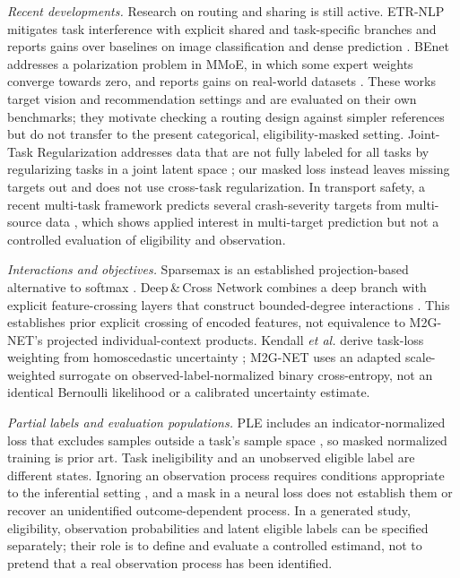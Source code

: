 \documentclass[9pt, conference, a4paper, compsocconf]{IEEEtran}
\begin{document}
\textit{Recent developments.} Research on routing and sharing is still active. ETR-NLP mitigates task interference with explicit shared and task-specific branches and reports gains over baselines on image classification and dense prediction \cite{Ding2023mitigating}. BEnet addresses a polarization problem in MMoE, in which some expert weights converge towards zero, and reports gains on real-world datasets \cite{Zhang2025bagging}. These works target vision and recommendation settings and are evaluated on their own benchmarks; they motivate checking a routing design against simpler references but do not transfer to the present categorical, eligibility-masked setting. Joint-Task Regularization addresses data that are not fully labeled for all tasks by regularizing tasks in a joint latent space \cite{Nishi2024joint}; our masked loss instead leaves missing targets out and does not use cross-task regularization. In transport safety, a recent multi-task framework predicts several crash-severity targets from multi-source data \cite{Xiao2025explainable}, which shows applied interest in multi-target prediction but not a controlled evaluation of eligibility and observation.

\textit{Interactions and objectives.} Sparsemax is an established projection-based alternative to softmax \cite{Martins2016from}. Deep\,\&\,Cross Network combines a deep branch with explicit feature-crossing layers that construct bounded-degree interactions \cite{Wang2017deep}. This establishes prior explicit crossing of encoded features, not equivalence to M2G-NET's projected individual-context products. Kendall \emph{et al.} derive task-loss weighting from homoscedastic uncertainty \cite{Kendall2018multi}; M2G-NET uses an adapted scale-weighted surrogate on observed-label-normalized binary cross-entropy, not an identical Bernoulli likelihood or a calibrated uncertainty estimate.

\textit{Partial labels and evaluation populations.} PLE includes an indicator-normalized loss that excludes samples outside a task's sample space \cite{Tang2020progressive}, so masked normalized training is prior art. Task ineligibility and an unobserved eligible label are different states. Ignoring an observation process requires conditions appropriate to the inferential setting \cite{RUBIN1976inference}, and a mask in a neural loss does not establish them or recover an unidentified outcome-dependent process. In a generated study, eligibility, observation probabilities and latent eligible labels can be specified separately; their role is to define and evaluate a controlled estimand, not to pretend that a real observation process has been identified.
\end{document}
